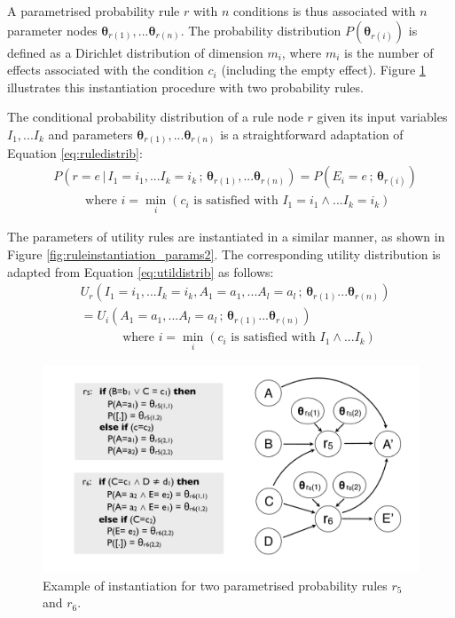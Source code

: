A parametrised probability rule $r$ with $n$ conditions is thus associated with $n$ parameter nodes $\boldsymbol\theta_{r(1)}, ... \boldsymbol\theta_{r(n)}$.  The probability distribution $P(\boldsymbol\theta_{r(i)})$ is defined as a Dirichlet distribution of dimension $m_i$, where $m_i$ is the number of effects associated with the condition $c_i$ (including the empty effect). Figure \ref{fig:ruleinstantiation_params} illustrates this instantiation procedure with two probability rules.  

The conditional probability distribution of a rule node $r$ given its input variables $I_1,...I_k$ and parameters $\boldsymbol\theta_{r(1)}, ... \boldsymbol\theta_{r(n)}$ is a straightforward adaptation of Equation \eqref{eq:ruledistrib}:
\begin{align}
& P(r\!=\!e \, | \, I_1\!=\!i_1,... I_k\!=\!i_k \, ; \, \boldsymbol\theta_{r(1)}, ... \boldsymbol\theta_{r(n)})  = P(E_i = e \, ; \, \boldsymbol\theta_{r(i)}) \\
& \; \; \; \; \; \; \; \; \text{ where } i = \min_i (c_i \text{ is satisfied with } I_1\!=\!i_1 \land ... I_k\!=\!i_k) \nonumber
\end{align}

The parameters of utility rules are instantiated in a similar manner, as shown in Figure \ref{fig:ruleinstantiation_params2}. The corresponding utility distribution is adapted from Equation \ref{eq:utildistrib} as follows:
\begin{align}
& U_r(I_1\!=\!i_1,... I_k\!=\!i_k, A_1\!=\!a_1,... A_l\!=\!a_l \, ; \, \boldsymbol\theta_{r(1)} ... \boldsymbol\theta_{r(n)}) \nonumber \\
& = U_i(A_1\!=\!a_1,... A_l\!=\!a_l \, ; \, \boldsymbol\theta_{r(1)} ... \boldsymbol\theta_{r(n)})  \label{eq:utildistrib}\\
&  \; \; \; \; \; \; \; \;  \; \; \; \text{ where } i = \min_i (c_i \text{ is satisfied with } I_1 \land ... I_k) \nonumber
\end{align}

\begin{figure}[h!]
\centering
\includegraphics[scale=0.25]{imgs/ruleinstantiation_params.pdf}
\caption{Example of instantiation for two parametrised probability rules $r_5$ and $r_6$.}
\label{fig:ruleinstantiation_params}
\end{figure}


